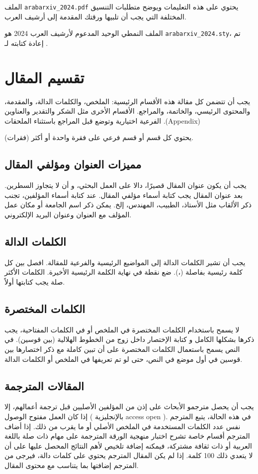 \documentclass[12pt]{article}
\begin{document}
الملف \verb+arabarxiv_2024.pdf+ يحتوي على هذه التعليمات ويوضح متطلبات التنسيق المختلفة التي يجب أن تلبيها ورقتك المقدمة إلى أرشيف العرب.


الملف النمطي \XeLaTeX{} الوحيد المدعوم لأرشيف العرب 2024 هو \verb+arabarxiv_2024.sty+، تم إعادة كتابته لـ \XeLaTeX{}.

\section{تقسيم المقال}
يجب أن تتضمن كل مقالة هذه الأقسام الرئيسية: الملخص، والكلمات الدالة، والمقدمة، والمحتوى الرئيسي، والخاتمة، والمراجع. الأقسام الأخرى مثل الشكر والتقدير والعناوين الفرعية اختيارية وتوضع قبل المراجع باستثناء الملحقات .(Appendix)

يحتوي كل قسم أو قسم فرعي على فقرة واحدة أو أكثر (فقرات).

\subsection{مميزات العنوان ومؤلفي المقال}
يجب أن يكون عنوان المقال قصيرًا، دالا على العمل البحثي، و أن لا يتجاوز السطرين.
بعد عنوان المقال يجب كتابة أسماء مؤلفي المقال. عند كتابة أسماء المؤلفين، تجنب ذكر الألقاب مثل الأستاذ، الطبيب، المهندس، إلخ. يمكن ذكر اسم الجامعة أو مكان عمل المؤلف مع العنوان وعنوان البريد الإلكتروني.

\subsection{الكلمات الدالة}
يجب أن تشير الكلمات الدالة إلى المواضيع الرئيسية والفرعية للمقالة. افصل بين كل كلمة رئيسية بفاصلة (،). ضع نقطة في نهاية الكلمة الرئيسية الأخيرة. الكلمات الأكثر صلة يجب كتابتها أولاً.

\subsection{الكلمات المختصرة}
لا يسمح باستخدام الكلمات المختصرة في الملخص أو في الكلمات المفتاحية، يجب ذكرها بشكلها الكامل و  كتابة الإختصار داخل زوج من الخطوط الهلالية (بين قوسين).
في النص يسمح باستعمال  الكلمات المختصرة على أن تبين كاملة مع ذكر اختصارها بين قوسين في أول موضع في النص، حتى لو تم تعريفها في الملخص أو الكلمات الدالة.

\subsection{المقالات المترجمة}
 يجب أن يحصل مترجمو الأبحاث على إذن من المؤلفين الأصليين قبل 
 ترجمة أعمالهم، إلا إذا كان العمل مفتوح الوصول ( بالإنجليزية access open ).
 في هذه الحالة، يتبع المترجم نفس عدد الكلمات المستخدمة في الملخص الأصلي أو ما يقرب من ذلك.
 إذا أضاف المترجم أقسام خاصة تشرح اختبار منهجية الورقة المترجمة على مهام ذات صلة باللغة العربية أو ذات ثقافة مشتركة، فيمكنه إضافة تلخيص لأهم النتائج المحصل عليها على أن لا يتعدي ذلك 100 كلمة.
 إذا لم يكن المقال المترجم يحتوي على كلمات دالة،  فيرجى من المترجم إضافتها بما يتناسب مع محتوى المقال. 
 
\end{document}
